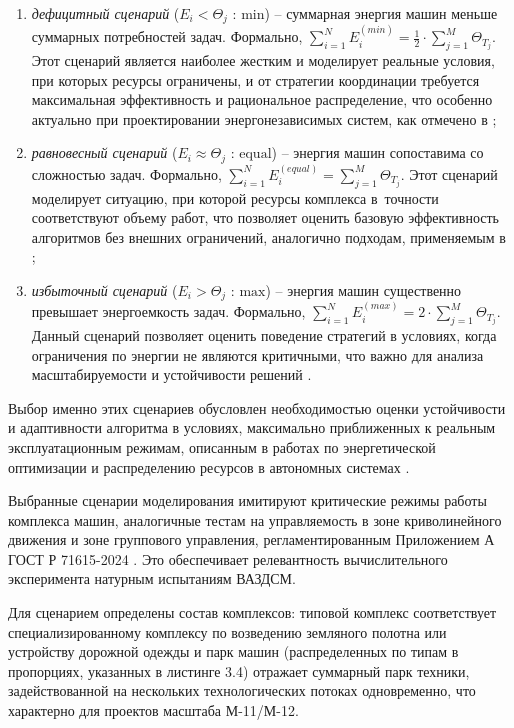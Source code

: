 \begin{enumerate}[beginpenalty=10000, midpenalty=10000, wide=\parindent, leftmargin=0pt]
	\item \textit{дефицитный сценарий} ($E_i < \Theta_j$ : $\text{min}$) -- суммарная энергия машин меньше суммарных потребностей задач. Формально, $\sum_{i=1}^{N} E_i^{(min)} = \frac{1}{2} \cdot \sum_{j=1}^{M} \Theta_{T_j}$. Этот сценарий является наиболее жестким и моделирует реальные условия, при которых ресурсы ограничены, и от стратегии координации требуется максимальная эффективность и рациональное распределение, что особенно актуально при проектировании энергонезависимых систем, как отмечено в \cite{VavilovAndImaev};
	\item \textit{равновесный сценарий} ($E_i \approx \Theta_j$ : $\text{equal}$) -- энергия машин сопоставима со сложностью задач. Формально, $\sum_{i=1}^{N} E_i^{(equal)} = \sum_{j=1}^{M} \Theta_{T_j}$. Этот сценарий моделирует ситуацию, при которой ресурсы комплекса в~точности соответствуют объему работ, что позволяет оценить базовую эффективность алгоритмов без внешних ограничений, аналогично подходам, применяемым в \cite{Robertson};
	\item \textit{избыточный сценарий} ($E_i > \Theta_j$ : $\text{max}$) -- энергия машин существенно превышает энергоемкость задач. Формально, $\sum_{i=1}^{N} E_i^{(max)} = 2 \cdot \sum_{j=1}^{M} \Theta_{T_j}$. Данный сценарий позволяет оценить поведение стратегий в условиях, когда ограничения по энергии не являются критичными, что важно для анализа масштабируемости и устойчивости решений \cite{Narusbaev, SandanEvtukov}.
\end{enumerate}

Выбор именно этих сценариев обусловлен необходимостью оценки устойчивости и адаптивности алгоритма в условиях, максимально приближенных к реальным эксплуатационным режимам, описанным в работах по энергетической оптимизации и распределению ресурсов в автономных системах \cite{TaranAndOver, Narusbaev}.

Выбранные сценарии моделирования имитируют критические режимы работы комплекса машин, аналогичные тестам на управляемость в зоне криволинейного движения и зоне группового управления, регламентированным Приложением А ГОСТ Р 71615-2024 \cite{gostR71615}. Это обеспечивает релевантность вычислительного эксперимента натурным испытаниям ВАЗДСМ.

Для сценарием определены состав комплексов: типовой комплекс соответствует специализированному комплексу по возведению земляного полотна или устройству дорожной одежды и парк машин (распределенных по типам в пропорциях, указанных в листинге 3.4) отражает суммарный парк техники, задействованной на нескольких технологических потоках одновременно, что характерно для проектов масштаба М-11/М-12.

